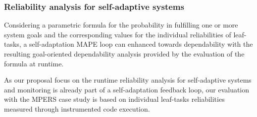 \subsubsection{Reliability analysis for self-adaptive systems}

Considering a parametric formula for the probability in fulfilling one or more system goals and the corresponding values for the individual reliabilities of leaf-tasks, a self-adaptation MAPE loop can enhanced towards dependability with the resulting goal-oriented dependability analysis provided by the evaluation of the formula at runtime.


As our proposal focus on the runtime reliability analysis for self-adaptive systems and monitoring is already part of a self-adaptation feedback loop, our evaluation with the MPERS case study is based on individual leaf-tasks reliabilities measured through instrumented code execution.



